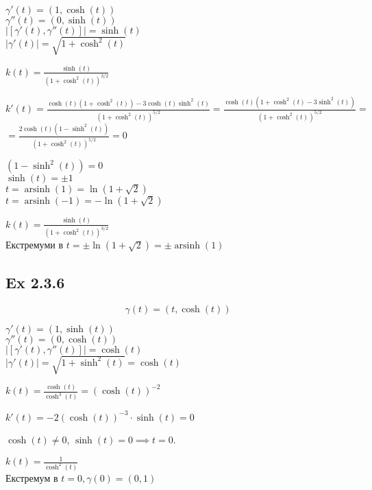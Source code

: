 \documentclass[10pt, a4paper]{article} %
\begin{document}
$\gamma'(t) = (1, \cosh(t))$\\
$\gamma''(t) = (0, \sinh(t))$\\
$|[\gamma'(t), \gamma''(t)]| = \sinh(t)$\\
$|\gamma'(t)| = \sqrt{1+\cosh^2(t)}$

$k(t) = \frac{\sinh(t)}{(1 + \cosh^2(t))^{3/2}}$

$k'(t) = \frac{\cosh(t)(1+\cosh^2(t))-3\cosh(t)\sinh^2(t)}{(1+\cosh^2(t))^{5/2}} 
= \frac{\cosh(t)(1+\cosh^2(t)-3\sinh^2(t))}{(1+\cosh^2(t))^{5/2}}=$
$= \frac{2\cosh(t)(1-\sinh^2(t))}{(1+\cosh^2(t))^{5/2}} = 0$

$(1-\sinh^2(t)) = 0$\\
$\sinh(t) = \pm 1$\\
$t = \operatorname{arsinh}(1) = \ln(1+\sqrt{2})$\\
$t = \operatorname{arsinh}(-1) = -\ln(1+\sqrt{2})$\\

\begin{mdframed}[backgroundcolor=green!20]
    $k(t) = \frac{\sinh(t)}{(1 + \cosh^2(t))^{3/2}}$\\
    Екстремуми в $t = \pm\ln(1+\sqrt{2}) = \pm\operatorname{arsinh}(1)$
\end{mdframed}


\subsection*{Ex 2.3.6}
\[\gamma(t) = (t, \cosh(t))\]

$\gamma'(t) = (1, \sinh(t))$\\
$\gamma''(t) = (0, \cosh(t))$\\
$|[\gamma'(t), \gamma''(t)]| = \cosh(t)$\\
$|\gamma'(t)| = \sqrt{1+\sinh^2(t)} = \cosh(t)$

$k(t) = \frac{\cosh(t)}{\cosh^3(t)} = (\cosh(t))^{-2}$

$k'(t) = -2(\cosh(t))^{-3}\cdot \sinh(t) = 0$

$\cosh(t) \ne 0$, $\sinh(t) = 0 \implies t = 0$.

\begin{mdframed}[backgroundcolor=green!20]
    $k(t) = \frac{1}{\cosh^2(t)}$\\
    Екстремум в $t = 0, \gamma(0) = (0,1)$
\end{mdframed}


\end{document}
